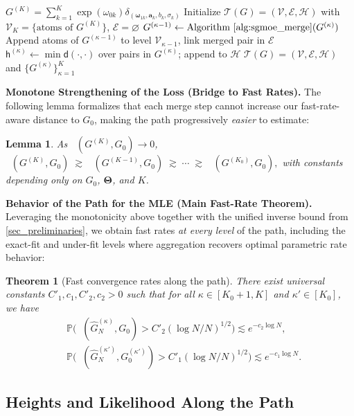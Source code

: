 \documentclass[twoside]{article}
\DeclareMathOperator*{\VDFRA}{D_{FRA}}
\DeclareMathOperator*{\VDE}{D_{E}}
\newcommand{\divclus}{\mathsf{d}}
\newcommand{\height}{\mathsf{h}}
\theoremstyle{plain}
\newtheorem{theorem}{Theorem}
\newtheorem{lemma}{Lemma}
\theoremstyle{definition}
\theoremstyle{plain}
\def\vTheta{{\bm{\Theta}}}
\def\vomega{{\bm{\omega}}}
\def\va{{\bm{a}}}
\def\gE{{\mathcal{E}}}
\def\gH{{\mathcal{H}}}
\def\gV{{\mathcal{V}}}
\def\sP{{\mathbb{P}}}
\newcommand{\cT}{\mathcal{T}}
\begin{document}
\begin{algorithm}[!ht]
\caption{SGMoE Hierarchical Aggregation Path}
\label{alg:sgmoe_path}
\begin{algorithmic}[1]
\Require $G^{(K)}=\sum_{k=1}^{K}\exp(\omega_{0k})\delta_{(\vomega_{1k},\va_k,b_k,\sigma_k)}$
\State Initialize $\cT(G)=(\gV,\gE,\gH)$ with $\gV_K=\{\text{atoms of }G^{(K)}\}$, $\gE=\varnothing$
  \State $G^{(\kappa-1)}\gets \text{Algorithm \ref{alg:sgmoe_merge}}(G^{(\kappa)})$
  \State Append atoms of $G^{(\kappa-1)}$ to level $\gV_{\kappa-1}$, link merged pair in $\gE$
  \State $\height^{(\kappa)}\gets \min\divclus(\cdot,\cdot)$ over pairs in $G^{(\kappa)}$; append to $\gH$
\EndFor
\State \Return $\cT(G)=(\gV,\gE,\gH)$ and $\{G^{(\kappa)}\}_{\kappa=1}^{K}$
\end{algorithmic}
\end{algorithm}

{\bf Monotone Strengthening of the Loss (Bridge to Fast Rates).}
The following lemma formalizes that each merge step cannot increase our fast-rate-aware distance to $G_0$, making the path progressively \emph{easier} to estimate:
\begin{lemma}
\label{lem:monotone_path}
As $\VDFRA (G^{(K)},G_0)\to0$,
\(
\VDFRA(G^{(K)},G_0)\;\gtrsim\;\VDFRA(G^{(K-1)},G_0)\;\gtrsim\;\cdots\;\gtrsim\;\VDFRA(G^{(K_0)},G_0),
\)
with constants depending only on $G_0$, $\vTheta$, and $K$.
\end{lemma}

{\bf Behavior of the Path for the MLE (Main Fast-Rate Theorem).}  
Leveraging the monotonicity above together with the unified inverse bound from \cref{sec_preliminaries}, we obtain fast rates \emph{at every level} of the path, including the exact-fit and under-fit levels where aggregation recovers  optimal parametric rate behavior:
\begin{theorem}[Fast convergence rates along the path]
\label{thm:path_rates}
There exist universal constants $C'_1,c_1,C'_2,c_2>0$ such that for all $\kappa\in[K_0+1,K]$ and $\kappa'\in[K_0]$, we have
\begin{align}
    &\sP\!\big(\VDFRA(\widehat G_N^{(\kappa)},G_0)>C'_2(\log N/N)^{1/2}\big)\lesssim e^{-c_2\log N}, \\
    &\sP\!\big(\VDE(\widehat G_N^{(\kappa')},G_0^{(\kappa')})>C'_1(\log N/N)^{1/2}\big)\lesssim e^{-c_1\log N}.\nonumber
\end{align}
\end{theorem}

\subsection{Heights and Likelihood Along the Path}
\label{subsec_heights_lik}
\end{document}
